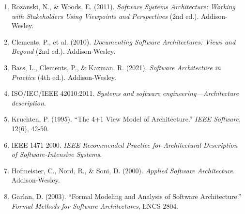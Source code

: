 \documentclass[11pt]{article}
\begin{document}
\begin{enumerate}
    \item Rozanski, N., \& Woods, E. (2011). \textit{Software Systems Architecture: Working with Stakeholders Using Viewpoints and Perspectives} (2nd ed.). Addison-Wesley.

    \item Clements, P., et al. (2010). \textit{Documenting Software Architectures: Views and Beyond} (2nd ed.). Addison-Wesley.

    \item Bass, L., Clements, P., \& Kazman, R. (2021). \textit{Software Architecture in Practice} (4th ed.). Addison-Wesley.

    \item ISO/IEC/IEEE 42010:2011. \textit{Systems and software engineering---Architecture description}.

    \item Kruchten, P. (1995). ``The 4+1 View Model of Architecture.'' \textit{IEEE Software}, 12(6), 42-50.

    \item IEEE 1471-2000. \textit{IEEE Recommended Practice for Architectural Description of Software-Intensive Systems}.

    \item Hofmeister, C., Nord, R., \& Soni, D. (2000). \textit{Applied Software Architecture}. Addison-Wesley.

    \item Garlan, D. (2003). ``Formal Modeling and Analysis of Software Architecture.'' \textit{Formal Methods for Software Architectures}, LNCS 2804.
\end{enumerate}
\end{document}
